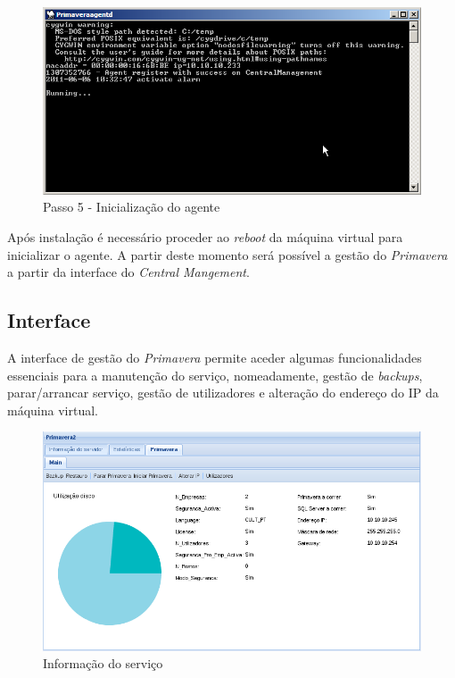 \begin{figure}[H]
    \begin{center}
    \includegraphics[scale=0.38]{screenshots/primavera/primaverainstall_05.png}
    \caption{Passo 5 - Inicialização do agente}
    \label{fig:primavera_install_passo5}
    \end{center}
\end{figure}

Após instalação é necessário proceder ao \textit{reboot} da máquina virtual para inicializar o agente.
A partir deste momento será possível a gestão do \textit{Primavera} a partir da interface do \textit{Central Mangement}.

\subsection{Interface}

A interface de gestão do \textit{Primavera} permite aceder algumas funcionalidades essenciais para a manutenção do serviço, nomeadamente, gestão de \textit{backups}, parar/arrancar serviço, gestão de utilizadores e alteração do endereço do IP da máquina virtual.

\begin{figure}[H]
    \begin{center}
    \includegraphics[scale=0.38]{screenshots/primavera/primaverainterface_01.png}
    \caption{Informação do serviço}
    \label{fig:primavera_info}
    \end{center}
\end{figure}

